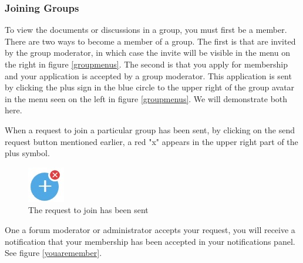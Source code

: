 \documentclass[10pt]{article}
\begin{document}
\subsubsection{Joining Groups}

\begin{flushleft}
To view the documents or discussions in a group, you must first be a member.  There are two ways to become a member of a group.  The first is that are invited by the group moderator, in which case the invite will be visible in the menu on the right in figure \ref{groupmenus}.  The second is that you apply for membership and your application is accepted by a group moderator.  This application is sent by clicking the plus sign in the blue circle to the upper right of the group avatar in the menu seen on the left in figure \ref{groupmenus}.  We will demonstrate both here. 
\end{flushleft}

\begin{flushleft}
When a request to join a particular group has been sent, by clicking on the send request button mentioned earlier, a red "x" appears in the upper right part of the plus symbol.  
\end{flushleft}

\begin{figure}[h]
    \centering
    \includegraphics[scale=1]{images/requestsent.jpg}
    \caption{The request to join has been sent}
    \label{requestsent}
\end{figure}

\begin{flushleft}
One a forum moderator or administrator accepts your request, you will receive a notification that your membership has been accepted in your notifications panel. See figure \ref{youaremember}.
\end{flushleft}
\end{document}
